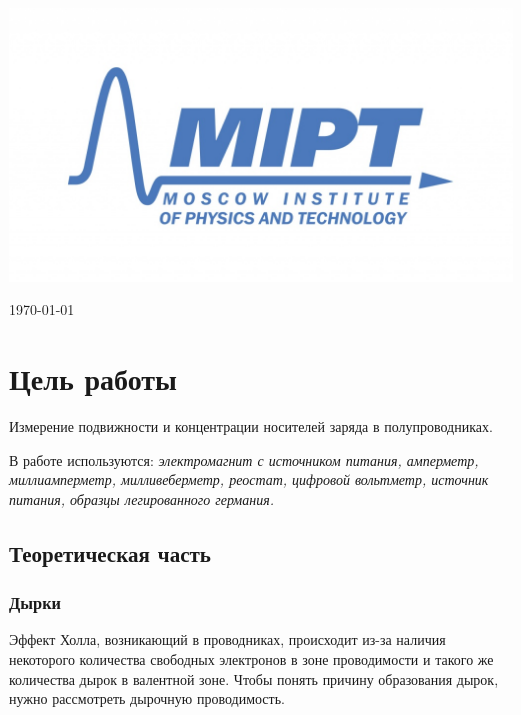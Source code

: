 \documentclass[a4paper, 12pt]{article}
\newenvironment{bottompar}{\par\vspace*{\fill}}{\clearpage}
\begin{document}
\begin{titlepage}
\begin{bottompar}
	\begin{center}
		\includegraphics[width = 80 mm]{logo.jpg}
	\end{center}
	{\large \today}

\end{bottompar}
\vfill %

\end{titlepage}

\section{Цель работы}
Измерение подвижности и концентрации носителей заряда в полупроводниках.

В работе используются: \textit{электромагнит с источником питания, амперметр, миллиамперметр, милливеберметр, реостат, цифровой вольтметр, источник питания, образцы легированного германия.}


\subsection*{Теоретическая часть}

\subsubsection*{Дырки}

Эффект Холла, возникающий в проводниках, происходит из-за наличия некоторого количества свободных электронов в зоне проводимости и такого же количества дырок в валентной зоне. Чтобы понять причину образования дырок, нужно рассмотреть дырочную проводимость.
\end{document}
